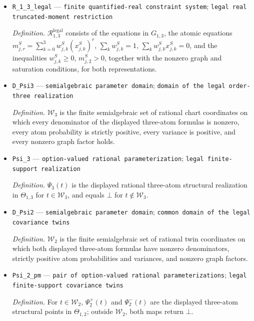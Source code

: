 \documentclass{article}
\begin{document}
\begin{itemize}
  \par\smallskip\noindent\emph{Definition.} \(G_{1,3}=(G_j)_j\) is an explicitly ordered generating list for \(J_{1,3}\).
  \item \texttt{R\_\allowbreak{}1\_\allowbreak{}3\_\allowbreak{}legal} --- \texttt{finite quantified-\allowbreak{}real constraint system}; \texttt{legal real truncated-\allowbreak{}moment restriction}
  \par\smallskip\noindent\emph{Definition.} \(\mathcal R^{\mathrm{legal}}_{1,3}\) consists of the equations in \(G_{1,3}\), the atomic equations \(m^{S}_{j,r}=\sum_{k=0}^{3}w^{S}_{j,k}(x^{S}_{j,k})^r\), \(\sum_kw^{S}_{j,k}=1\), \(\sum_kw^{S}_{j,k}x^{S}_{j,k}=0\), and the inequalities \(w^{S}_{j,k}\ge0\), \(m^{S}_{j,2}>0\), together with the nonzero graph and saturation conditions, for both representations.
  \item \texttt{D\_\allowbreak{}Psi3} --- \texttt{semialgebraic parameter domain}; \texttt{domain of the legal order-\allowbreak{}three realization}
  \par\smallskip\noindent\emph{Definition.} \(\mathcal W_3\) is the finite semialgebraic set of rational chart coordinates on which every denominator of the displayed three-atom formulas is nonzero, every atom probability is strictly positive, every variance is positive, and every nonzero graph factor holds.
  \item \texttt{Psi\_\allowbreak{}3} --- \texttt{option-\allowbreak{}valued rational parameterization}; \texttt{legal finite-\allowbreak{}support realization}
  \par\smallskip\noindent\emph{Definition.} \(\Psi_3(t)\) is the displayed rational three-atom structural realization in \(\Theta_{1,3}\) for \(t\in\mathcal W_3\), and equals \(\bot\) for \(t\notin\mathcal W_3\).
  \item \texttt{D\_\allowbreak{}Psi2} --- \texttt{semialgebraic parameter domain}; \texttt{common domain of the legal covariance twins}
  \par\smallskip\noindent\emph{Definition.} \(\mathcal W_2\) is the finite semialgebraic set of rational twin coordinates on which both displayed three-atom formulas have nonzero denominators, strictly positive atom probabilities and variances, and nonzero graph factors.
  \item \texttt{Psi\_\allowbreak{}2\_\allowbreak{}pm} --- \texttt{pair of option-\allowbreak{}valued rational parameterizations}; \texttt{legal finite-\allowbreak{}support covariance twins}
  \par\smallskip\noindent\emph{Definition.} For \(t\in\mathcal W_2\), \(\Psi_2^{+}(t)\) and \(\Psi_2^{-}(t)\) are the displayed three-atom structural points in \(\Theta_{1,2}\); outside \(\mathcal W_2\), both maps return \(\bot\).

\end{itemize}
\end{document}
